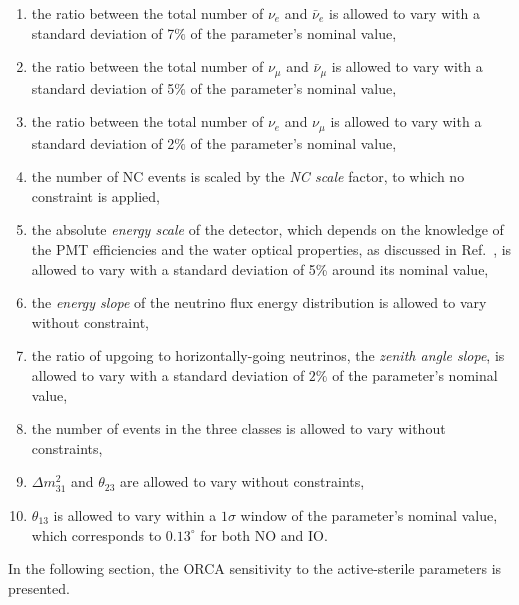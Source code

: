 \begin{enumerate}
	\item \label{sysnew-2} the ratio between the total number of $\nu_e$ and $\bar{\nu}_e$ is allowed to vary with a standard deviation of 7$\%$ of the parameter's nominal value,
	\item the ratio between the total number of $\nu_\mu$ and $\bar{\nu}_\mu$ is allowed to vary with a standard deviation of 5$\%$ of the parameter's nominal value,
	\item the ratio between the total number of $\nu_e$ and $\nu_\mu$ is allowed to vary  with a standard deviation of 2$\%$ of the parameter's nominal value,
	\item the number of NC events is scaled by the \textit{NC scale} factor, to which no constraint is applied,
	\item the absolute \textit{energy scale} of the detector, which depends on the knowledge of the PMT efficiencies and the water optical properties, as discussed in Ref.~\cite{ORCA_NMO_Paper}, is allowed to vary with a standard deviation of 5\% around its nominal value,
	\item the \textit{energy slope} of the neutrino flux energy distribution is allowed to vary without constraint,
	\item \label{sysnew-1} the ratio of upgoing to horizontally-going neutrinos, the \textit{zenith angle slope}, is allowed to vary with a standard deviation of $2\%$ of the parameter's nominal value,
	\item  \label{sysnew-L} the number of events in the three classes is allowed to vary without constraints,
	\item $\Delta m_{31}^2$ and $\theta_{23}$ are allowed to vary without constraints,
	\item $\theta_{13}$ is allowed to vary within a $1\sigma$ window of the parameter's nominal value, which corresponds to $0.13^\circ$ for both NO and IO.
\end{enumerate}
In the following section, the ORCA sensitivity to the active-sterile parameters is presented.


